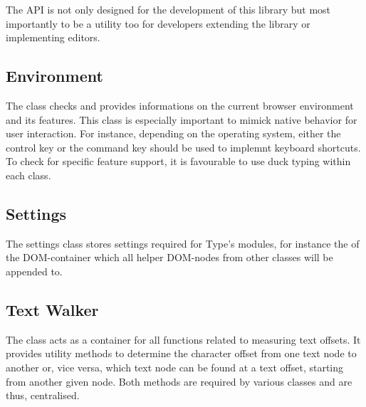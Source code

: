 \noindent The API is not only designed for the development of this library but most importantly to be a utility too for developers extending the library or implementing editors.



\subsection{Environment}

The  class checks and provides informations on the current browser environment and its features. This class is especially important to mimick native behavior for user interaction. For instance, depending on the operating system, either the control key or the command key should be used to implemnt keyboard shortcuts. To check for specific feature support, it is favourable to use duck typing within each class.



\subsection{Settings}

The settings class stores settings required for Type's modules, for instance the  of the DOM-container which all helper DOM-nodes from other classes will be appended to.

\subsection{Text Walker}

The  class acts as a container for all functions related to measuring text offsets. It provides utility methods to determine the character offset from one text node to another or, vice versa, which text node can be found at a text offset, starting from another given node. Both methods are required by various classes and are thus, centralised. 

